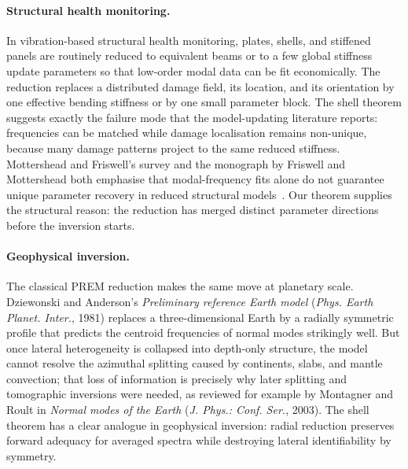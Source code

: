 \paragraph{Structural health monitoring.}
In vibration-based structural health monitoring, plates, shells, and stiffened
panels are routinely reduced to equivalent beams or to a few global stiffness
update parameters so that low-order modal data can be fit economically.  The
reduction replaces a distributed damage field, its location, and its orientation
by one effective bending stiffness or by one small parameter block.  The shell
theorem suggests exactly the failure mode that the model-updating literature
reports:
frequencies can be matched while damage localisation remains non-unique, because
many damage patterns project to the same reduced stiffness.  Mottershead and
Friswell's survey and the monograph by Friswell and Mottershead both emphasise
that modal-frequency fits alone do not guarantee unique parameter recovery in
reduced structural models~\cite{MottersheadFriswell1993,FriswellMottershead1995}.
Our theorem supplies the structural reason: the reduction has merged distinct
parameter directions before the inversion starts.

\paragraph{Geophysical inversion.}
The classical PREM reduction makes the same move at planetary scale.  Dziewonski
and Anderson's \emph{Preliminary reference Earth model} (\emph{Phys. Earth
Planet. Inter.}, 1981) replaces a three-dimensional Earth by a radially
symmetric profile that predicts the centroid frequencies of normal modes
strikingly well.  But once lateral heterogeneity is collapsed into depth-only
structure, the model cannot resolve the azimuthal splitting caused by
continents, slabs, and mantle convection; that loss of information is precisely
why later splitting and tomographic inversions were needed, as reviewed for
example by Montagner and Roult in \emph{Normal modes of the Earth} (\emph{J.
Phys.: Conf. Ser.}, 2003).  The shell theorem has a clear analogue in
geophysical inversion: radial reduction preserves forward adequacy for averaged
spectra while destroying lateral identifiability by symmetry.

